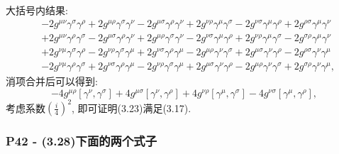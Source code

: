 \documentclass[cn,hazy,blue,11pt,device=normal,chinesefont=founder]{elegantnote}
\begin{document}
大括号内结果: 
\begin{equation}
  \begin{aligned}
    &- 2g^{\mu\nu}\gamma^\sigma \gamma^\rho + 2g^{\mu\rho}\gamma^\sigma \gamma^\nu - 2g^{\mu\sigma}\gamma^\rho \gamma^\nu + 2g^{\nu\rho}\gamma^\mu \gamma^\sigma - 2g^{\nu\sigma}\gamma^\mu \gamma^\rho + 2g^{\rho\sigma}\gamma^\mu \gamma^\nu \\
    &+ 2g^{\mu\nu}\gamma^\rho \gamma^\sigma - 2g^{\mu\sigma}\gamma^\rho \gamma^\nu + 2g^{\mu\rho}\gamma^\sigma \gamma^\nu - 2g^{\nu\sigma}\gamma^\mu \gamma^\rho + 2g^{\nu\rho}\gamma^\mu \gamma^\sigma - 2g^{\sigma\rho}\gamma^\mu \gamma^\nu \\
    &+ 2g^{\nu\mu}\gamma^\sigma \gamma^\rho - 2g^{\nu\rho}\gamma^\sigma \gamma^\mu + 2g^{\nu\sigma}\gamma^\rho \gamma^\mu - 2g^{\mu\rho}\gamma^\nu \gamma^\sigma + 2g^{\mu\sigma}\gamma^\nu \gamma^\rho - 2g^{\rho\sigma}\gamma^\nu \gamma^\mu \\
    &- 2g^{\nu\mu}\gamma^\rho \gamma^\sigma + 2g^{\nu\sigma}\gamma^\rho \gamma^\mu - 2g^{\nu\rho}\gamma^\sigma \gamma^\mu + 2g^{\mu\sigma}\gamma^\nu \gamma^\rho - 2g^{\mu\rho}\gamma^\nu \gamma^\sigma + 2g^{\sigma\rho}\gamma^\nu \gamma^\mu,  
  \end{aligned}
\end{equation}
消项合并后可以得到: 
\begin{equation}
  -4g^{\mu\rho}[\gamma^\nu, \gamma^\sigma] + 4g^{\mu\sigma}[\gamma^\nu, \gamma^\rho] + 4g^{\nu\rho}[\gamma^\mu, \gamma^\sigma] - 4g^{\nu\sigma}[\gamma^\mu, \gamma^\rho],  
\end{equation}
考虑系数$(\frac{i}{4})^2$, 即可证明(3.23)满足(3.17).

\subsubsection{P42 - (3.28)下面的两个式子}
\end{document}
